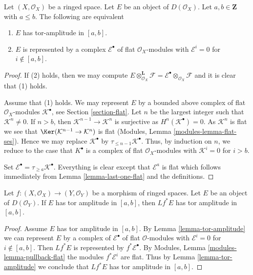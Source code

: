 \begin{lemma}
\label{lemma-tor-amplitude}
Let $(X, \mathcal{O}_X)$ be a ringed space.
Let $E$ be an object of $D(\mathcal{O}_X)$.
Let $a, b \in \mathbf{Z}$ with $a \leq b$. The following are equivalent
\begin{enumerate}
\item $E$ has tor-amplitude in $[a, b]$.
\item $E$ is represented by a complex
$\mathcal{E}^\bullet$ of flat $\mathcal{O}_X$-modules with
$\mathcal{E}^i = 0$ for $i \not \in [a, b]$.
\end{enumerate}
\end{lemma}

\begin{proof}
If (2) holds, then we may compute
$E \otimes_{\mathcal{O}_X}^\mathbf{L} \mathcal{F} =
\mathcal{E}^\bullet \otimes_{\mathcal{O}_X} \mathcal{F}$
and it is clear that (1) holds.

\medskip\noindent
Assume that (1) holds. We may represent $E$ by a bounded above complex
of flat $\mathcal{O}_X$-modules $\mathcal{K}^\bullet$, see
Section \ref{section-flat}.
Let $n$ be the largest integer such that $\mathcal{K}^n \not = 0$.
If $n > b$, then $\mathcal{K}^{n - 1} \to \mathcal{K}^n$ is surjective as
$H^n(\mathcal{K}^\bullet) = 0$. As $\mathcal{K}^n$ is flat we see that
$\Ker(\mathcal{K}^{n - 1} \to \mathcal{K}^n)$ is flat
(Modules, Lemma \ref{modules-lemma-flat-ses}).
Hence we may replace $\mathcal{K}^\bullet$ by
$\tau_{\leq n - 1}\mathcal{K}^\bullet$. Thus, by induction on $n$, we
reduce to the case that $K^\bullet$ is a complex of flat
$\mathcal{O}_X$-modules with $\mathcal{K}^i = 0$ for $i > b$.

\medskip\noindent
Set $\mathcal{E}^\bullet = \tau_{\geq a}\mathcal{K}^\bullet$.
Everything is clear except that $\mathcal{E}^a$ is flat
which follows immediately from Lemma \ref{lemma-last-one-flat}
and the definitions.
\end{proof}

\begin{lemma}
\label{lemma-tor-amplitude-pullback}
Let $f : (X, \mathcal{O}_X) \to (Y, \mathcal{O}_Y)$ be a morphism of ringed
spaces. Let $E$ be an object of $D(\mathcal{O}_Y)$.
If $E$ has tor amplitude in $[a, b]$, then $Lf^*E$ has tor amplitude in
$[a, b]$.
\end{lemma}

\begin{proof}
Assume $E$ has tor amplitude in $[a, b]$. By
Lemma \ref{lemma-tor-amplitude}
we can represent $E$ by a complex of
$\mathcal{E}^\bullet$ of flat $\mathcal{O}$-modules with
$\mathcal{E}^i = 0$ for $i \not \in [a, b]$. Then
$Lf^*E$ is represented by $f^*\mathcal{E}^\bullet$.
By Modules, Lemma \ref{modules-lemma-pullback-flat}
the modules $f^*\mathcal{E}^i$ are flat.
Thus by Lemma \ref{lemma-tor-amplitude}
we conclude that $Lf^*E$ has tor amplitude in $[a, b]$.
\end{proof}

